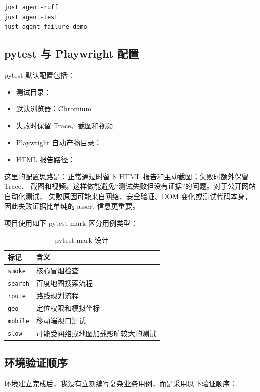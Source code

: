 \documentclass[UTF8,a4paper,12pt]{ctexart}
\begin{document}
\begin{lstlisting}[language=bash]
just agent-ruff
just agent-test
just agent-failure-demo
\end{lstlisting}

\subsection{pytest 与 Playwright 配置}

pytest 默认配置包括：

\begin{itemize}
  \item 测试目录：
  \item 默认浏览器：Chromium
  \item 失败时保留 Trace、截图和视频
  \item Playwright 自动产物目录：
  \item HTML 报告路径：
\end{itemize}

这里的配置思路是：正常通过时留下 HTML 报告和主动截图；失败时额外保留 Trace、
截图和视频。这样做能避免“测试失败但没有证据”的问题。对于公开网站自动化测试，
失败原因可能来自网络、安全验证、DOM 变化或测试代码本身，因此失败证据比单纯的
assert 信息更重要。

项目使用如下 pytest mark 区分用例类型：

\begin{table}[H]
\centering
\caption{pytest mark 设计}
\begin{tabular}{ll}
\toprule
标记 & 含义 \\
\midrule
\texttt{smoke} & 核心冒烟检查 \\
\texttt{search} & 百度地图搜索流程 \\
\texttt{route} & 路线规划流程 \\
\texttt{geo} & 定位权限和模拟坐标 \\
\texttt{mobile} & 移动端视口测试 \\
\texttt{slow} & 可能受网络或地图加载影响较大的测试 \\
\bottomrule
\end{tabular}
\end{table}

\subsection{环境验证顺序}

环境建立完成后，我没有立刻编写复杂业务用例，而是采用以下验证顺序：
\end{document}
